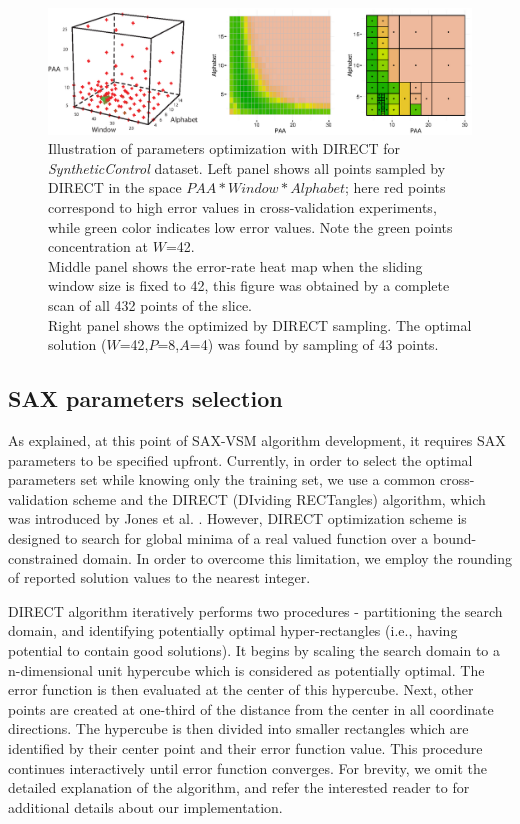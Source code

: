 \documentclass{llncs}
\newcommand{\myfigureshrinker}{\vspace{-1.1cm}}
\begin{document}
\begin{figure}[t]
   \myfigureshrinker
   \centering
   \includegraphics[width=115mm]{figures/figure_direct.eps}
   \caption{Illustration of parameters optimization with DIRECT 
   for \textit{SyntheticControl} dataset. 
   Left panel shows all points sampled by DIRECT in the space $PAA*Window*Alphabet$; here
   red points correspond to high error values in cross-validation experiments, while green color 
   indicates low error values. Note the green points concentration at $W$=42.\\ 
   Middle panel shows the error-rate heat map when the sliding window size is fixed to 42, 
   this figure was obtained by a complete scan of all 432 points of the slice.\\ 
   Right panel shows the optimized by DIRECT sampling. The optimal solution 
   ($W$=42,$P$=8,$A$=4) was found by sampling of 43 points.}
   \label{fig:direct-sampling}
\end{figure}

\subsection{SAX parameters selection} \label{section-direct}
As explained, at this point of SAX-VSM algorithm development, it requires SAX parameters 
to be specified upfront. Currently, in order to select the optimal parameters set while
knowing only the training set, we use a common cross-validation scheme and the 
DIRECT (DIviding RECTangles) algorithm, which was introduced by 
Jones et al. \cite{direct-original}.
However, DIRECT optimization scheme is designed to search for global minima of a real 
valued function over a bound-constrained domain. In order to overcome this limitation, we 
employ the rounding of reported solution values to the nearest integer.

DIRECT algorithm iteratively performs two procedures - partitioning the search domain, 
and identifying potentially optimal hyper-rectangles (i.e., having potential to contain good
solutions). 
It begins by scaling the search domain to a n-dimensional unit hypercube which is considered 
as potentially optimal. The error function is then evaluated at the center of this hypercube. Next, 
other points are created at one-third of the distance from the center in all coordinate directions. 
The hypercube is then divided into smaller rectangles which are identified by their center point 
and their error function value. This procedure continues interactively until error function
converges.
For brevity, we omit the detailed explanation of the algorithm, and refer the 
interested reader to \cite{direct} for additional details about our implementation.
\end{document}
